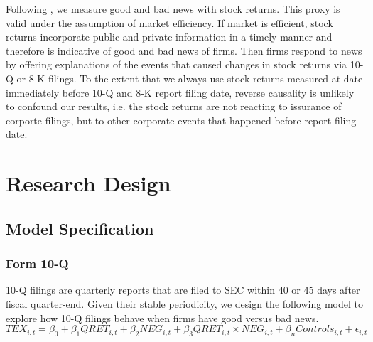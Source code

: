 \documentclass[a4paper]{article}
\begin{document}
\begin{spacing}{2}
Following \cite{basuConservatismPrincipleAsymmetric1997}, we measure good and bad news with stock returns. This proxy is valid under the assumption of market efficiency. If market is efficient, stock returns incorporate public and private information in a timely manner and therefore is indicative of good and bad news of firms. %
Then firms respond to news by offering explanations of the events that caused changes in stock returns via 10-Q or 8-K filings. To the extent that we always use stock returns measured at date immediately before 10-Q and 8-K report filing date, reverse causality is unlikely to confound our results, i.e. the stock returns are not reacting to issurance of corporte filings, but to other corporate events that happened before report filing date.

\section{Research Design}
\subsection{Model Specification}
\subsubsection{Form 10-Q}
10-Q filings are quarterly reports that are filed to SEC within 40 or 45 days after fiscal quarter-end. Given their stable periodicity, we design the following model to explore how 10-Q filings behave when firms have good versus bad news. 
\begin{equation} \label{eq1}
TEX_{i,t}=\beta_0+\beta_1QRET_{i,t}+\beta_2NEG_{i,t}+\beta_3QRET_{i,t}\times NEG_{i,t}+\beta_nControls_{i,t}+\epsilon_{i,t}
\end{equation}


\end{spacing}
\end{document}
